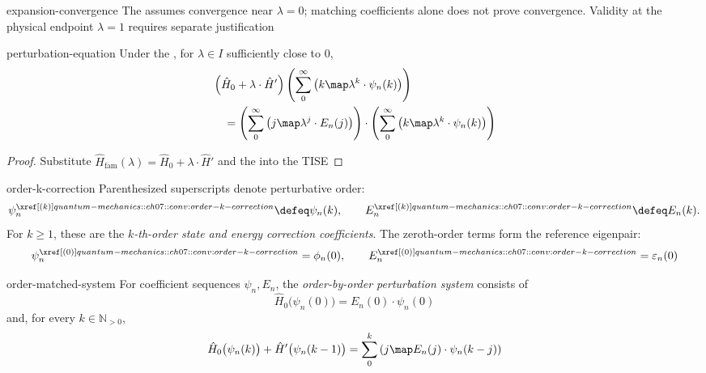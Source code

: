 \documentclass[12pt]{article}
\begin{document}
\begin{rem}{expansion-convergence}
  The  assumes convergence near $\lambda = 0$; matching coefficients alone does not prove convergence. Validity at the physical endpoint $\lambda = 1$ requires separate justification
\end{rem}

\begin{thm}{perturbation-equation}
  Under the , for $\lambda \in I$ sufficiently close to $0$,
  \[
    \begin{aligned}
      &\left(\hat H_0 + \lambda \cdot \hat H'\right)
      \left(\sum_{0}^{\infty}\left(k \map \lambda^k \cdot \psi_n(k)\right)\right) \\
      &\quad =
      \left(\sum_{0}^{\infty}\left(j \map \lambda^j \cdot E_n(j)\right)\right)
      \cdot
      \left(\sum_{0}^{\infty}\left(k \map \lambda^k \cdot \psi_n(k)\right)\right)
    \end{aligned}
  \]
\end{thm}

\begin{proof}
  Substitute $\hat H_{\mathrm{fam}}(\lambda) = \hat H_0 + \lambda \cdot \hat H'$ and the  into the TISE
\end{proof}

\begin{conv}{order-k-correction}
  Parenthesized superscripts denote perturbative order:
  \[
    \psi_n^{\porder{k}} \defeq \psi_n(k),
    \qquad
    E_n^{\porder{k}} \defeq E_n(k).
  \]
  For $k \geq 1$, these are the \emph{$k$-th-order state and energy correction coefficients}. The zeroth-order terms form the reference eigenpair:
  \[
    \psi_n^{\porder{0}} = \phi_n(0),
    \qquad
    E_n^{\porder{0}} = \varepsilon_n(0)
  \]
\end{conv}

\begin{dfn}{order-matched-system}
  For coefficient sequences $\psi_n,E_n$, the \emph{order-by-order perturbation system} consists of
  \[
    \hat H_0\bigl(\psi_n(0)\bigr) = E_n(0) \cdot \psi_n(0)
  \]
  and, for every $k \in \mathbb N_{>0}$,
  \[
    \hat H_0\bigl(\psi_n(k)\bigr) + \hat H'\bigl(\psi_n(k-1)\bigr)
    = \sum_{0}^{k}\left(j \map E_n(j) \cdot \psi_n(k-j)\right)
  \]
\end{dfn}
\end{document}
